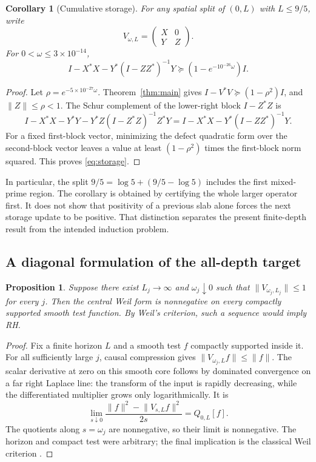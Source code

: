 \documentclass[11pt]{article}
\numberwithin{equation}{section}
\newtheorem{proposition}[theorem]{Proposition}
\newtheorem{corollary}[theorem]{Corollary}
\theoremstyle{definition}
\theoremstyle{remark}
\newcommand{\norm}[1]{\lVert#1\rVert}
\begin{document}
\begin{corollary}[Cumulative storage]\label{cor:storage}
For any spatial split of $(0,L)$ with $L\le9/5$, write
\[
 V_{\omega,L}=\begin{pmatrix}X&0\\Y&Z\end{pmatrix}.
\]
For $0<\omega\le3\times10^{-14}$,
\begin{equation}\label{eq:storage}
 I-X^*X-Y^*(I-ZZ^*)^{-1}Y
 \succeq(1-e^{-10^{-26}\omega})I.
\end{equation}
\end{corollary}
\begin{proof}
Let $\rho=e^{-5\times10^{-27}\omega}$. Theorem~\ref{thm:main} gives
$I-V^*V\succeq(1-\rho^2)I$, and $\norm Z\le\rho<1$.
The Schur complement of the lower-right block $I-Z^*Z$ is
\[
 I-X^*X-Y^*Y-Y^*Z(I-Z^*Z)^{-1}Z^*Y
 =I-X^*X-Y^*(I-ZZ^*)^{-1}Y.
\]
For a fixed first-block vector, minimizing the defect quadratic form over
the second-block vector leaves a value at least
$(1-\rho^2)$ times the first-block norm squared. This proves
\eqref{eq:storage}.
\end{proof}

In particular, the split $9/5=\log5+(9/5-\log5)$ includes the first
mixed-prime region. The corollary is obtained by certifying the whole larger
operator first. It does not show that positivity of a previous slab alone
forces the next storage update to be positive. That distinction separates
the present finite-depth result from the intended induction problem.

\subsection{A diagonal formulation of the all-depth target}

\begin{proposition}\label{prop:diagonal}
Suppose there exist $L_j\to\infty$ and $\omega_j\downarrow0$ such that
$\norm{V_{\omega_j,L_j}}\le1$ for every $j$. Then the central Weil form
is nonnegative on every compactly supported smooth test function.
By Weil's criterion, such a sequence would imply RH.
\end{proposition}
\begin{proof}
Fix a finite horizon $L$ and a smooth test $f$ compactly supported inside it.
For all sufficiently large $j$, causal compression gives
$\norm{V_{\omega_j,L}f}\le\norm f$.
The scalar derivative at zero on this smooth core follows by dominated
convergence on a far right Laplace line: the transform of the input is
rapidly decreasing, while the differentiated multiplier grows only
logarithmically. It is
\[
 \lim_{s\downarrow0}\frac{\norm f^2-\norm{V_{s,L}f}^2}{2s}
 =Q_{0,L}[f].
\]
The quotients along $s=\omega_j$ are nonnegative, so their limit is
nonnegative. The horizon and compact test were arbitrary; the final
implication is the classical Weil criterion
\cite{ConnesConsani2020,Conrey2019}.
\end{proof}
\end{document}
